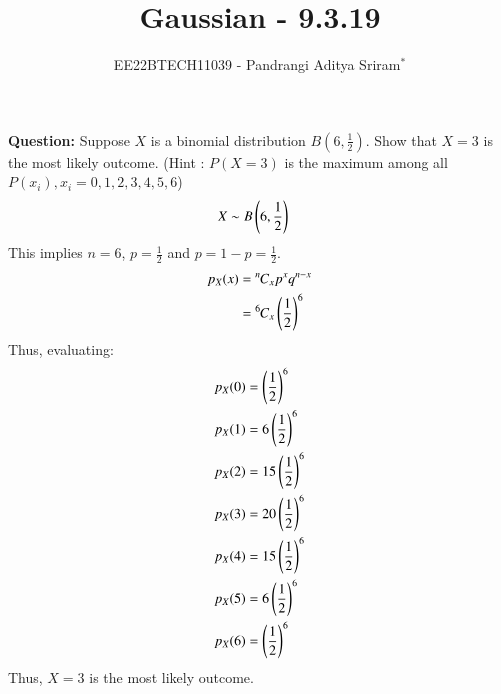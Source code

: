 \documentclass[journal,12pt,twocolumn]{IEEEtran}
\theoremstyle{remark}
\begin{document}

\vspace{3cm}

\title{Gaussian - 9.3.19}
\author{EE22BTECH11039 - Pandrangi Aditya Sriram$^{*}$%
}
\maketitle
\newpage
\bigskip

\renewcommand{\thefigure}{\theenumi}
\renewcommand{\thetable}{\theenumi}


\vspace{3cm}
\textbf{Question:} Suppose $X$ is a binomial distribution $B\left(6,\frac{1}{2}\right)$. Show that $X=3$ is the most likely outcome.
(Hint : $P(X=3)$ is the maximum among all $P(x_i),x_i=0,1,2,3,4,5,6$)\\
\solution
\begin{align}
    X &\sim B\left(6,\frac{1}{2}\right)
\end{align}
This implies $n = 6$, $p = \frac{1}{2}$ and $p = 1 - p = \frac{1}{2}$. 
\begin{align}
    p_X(x) &= {{}^{n}\mkern-1muC_{x}}p^xq^{n-x}\\
    &= {{}^{6}\mkern-1muC_{x}} \left(\frac{1}{2}\right)^6
\end{align}
Thus, evaluating:
\begin{align}
    p_X(0) &= \left(\frac{1}{2}\right)^6\\
    p_X(1) &= 6 \left(\frac{1}{2}\right)^6\\
    p_X(2) &= 15 \left(\frac{1}{2}\right)^6\\
    p_X(3) &= 20 \left(\frac{1}{2}\right)^6\\
    p_X(4) &= 15 \left(\frac{1}{2}\right)^6\\
    p_X(5) &= 6 \left(\frac{1}{2}\right)^6\\
    p_X(6) &= \left(\frac{1}{2}\right)^6
\end{align}
Thus, $X = 3$ is the most likely outcome.
\end{document}
